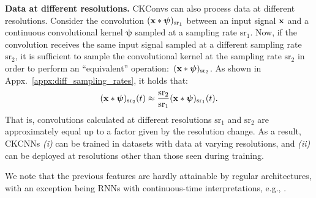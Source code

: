\documentclass{article}
\renewcommand{\vec}[1]{\ensuremath{\mathbf{\MakeLowercase{{#1}}}}}
\newcommand{\xv}{\vec{x}}
\begin{document}
\textbf{Data at different resolutions.} CKConvs can also process data at different resolutions. Consider the convolution $(\xv *\boldsymbol{\psi})_\mathrm{sr_1}$ between an input signal $\xv$ and a continuous convolutional kernel $\boldsymbol{\psi}$ sampled at a sampling rate $\mathrm{sr}_1$. Now, if the convolution receives the same input signal sampled at a different sampling rate $\mathrm{sr}_2$, it is sufficient to sample the convolutional kernel at the sampling rate $\mathrm{sr_2}$ in order to perform an \enquote{equivalent} operation:~$(\xv *\boldsymbol{\psi})_\mathrm{sr_2}$. As shown in Appx.~\ref{appx:diff_sampling_rates}, it holds that:
\begin{equation}\label{eq:diff_sampling_rates}
\setlength{\abovedisplayskip}{3pt}
\setlength{\belowdisplayskip}{3pt}
    (\xv *\boldsymbol{\psi})_\mathrm{sr_2}(t) \approx \frac{\mathrm{sr_2}}{\mathrm{sr_1}}(\xv *\boldsymbol{\psi})_\mathrm{sr_1}(t).
\end{equation}
That is, convolutions calculated at different resolutions $\mathrm{sr_1}$ and $\mathrm{sr_2}$ are approximately equal up to a factor given by the resolution change. As a result, CKCNNs \emph{(i)} can be trained in datasets with data at varying resolutions, and \emph{(ii)} can be deployed at resolutions other than those seen during training.

We note that the previous features are hardly attainable by regular architectures, with an exception being RNNs with continuous-time interpretations, e.g., \citet{gu2020hippo,kidger2020neural}.
\end{document}
